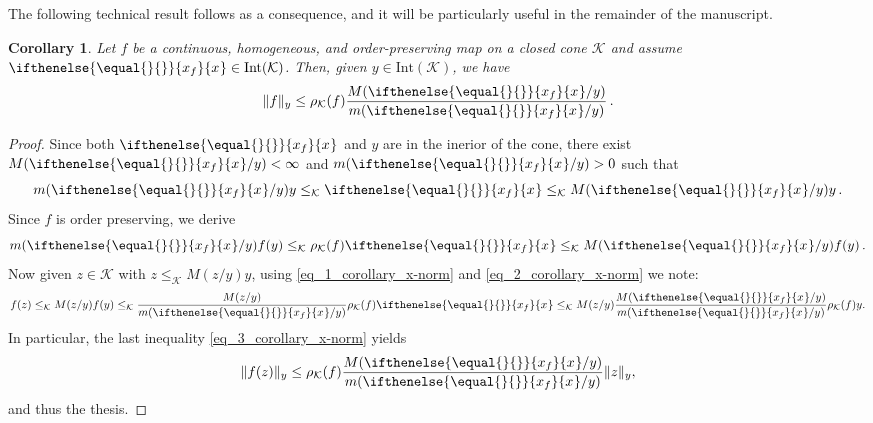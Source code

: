 \documentclass{article}
\newtheorem{corollary}[theorem]{Corollary}
\newcommand{\cradius}{\rho_{\cone}}
\newcommand{\cone}{\mathcal{K}}
\newcommand{\interior}{\mathrm{Int}}
\newcommand{\cleq}{\leq_{\cone}}
\newcommand{\ceigenvector}[1][]{
  \ifthenelse{\equal{#1}{}}
  {{x_f}}
  {{x}_{#1}}}
\begin{document}
The following technical result follows as a consequence, and it will be particularly useful in the remainder of the manuscript.
%

\begin{corollary}\label{Corollary_x-norm}
Let $f$ be a continuous, homogeneous, and order-preserving map on a closed cone $\cone$ and assume $\ceigenvector\in\interior(\cone)$. Then, given $y\in\interior(\cone)$, we have
\begin{equation}
\|f\|_y \leq \cradius(f) \frac{M(\ceigenvector/y)}{m(\ceigenvector/y)}\,.
\end{equation}
\end{corollary}
\begin{proof}
Since both $\ceigenvector$ and $y$ are in the inerior of the cone, there exist $M(\ceigenvector/y)<\infty$ and $m(\ceigenvector/y)>0$ such that
% 
\begin{equation}\label{eq_1_corollary_x-norm}
m(\ceigenvector/y)y\cleq \ceigenvector \cleq M(\ceigenvector/y)y\,.
\end{equation}
%
Since $f$ is order preserving, we derive 
\begin{equation}\label{eq_2_corollary_x-norm}
m(\ceigenvector/y)f(y)\cleq \cradius(f)\ceigenvector \cleq M(\ceigenvector/y)f(y)\,.
\end{equation}
Now given $z\in\cone$ with $z\cleq M(z/y)y$, using \eqref{eq_1_corollary_x-norm} and \eqref{eq_2_corollary_x-norm} we note:
\begin{equation}\label{eq_3_corollary_x-norm}
f(z)\cleq M(z/y)f(y)\cleq \frac{M(z/y)}{m(\ceigenvector/y)}\cradius(f)\ceigenvector \cleq M(z/y)\frac{M(\ceigenvector/y)}{m(\ceigenvector/y)}\cradius(f)y.
\end{equation} 
In particular, the last inequality \eqref{eq_3_corollary_x-norm} yields 
\begin{equation}
\|f(z)\|_y\leq \cradius(f) \frac{M(\ceigenvector/y)}{m(\ceigenvector/y)} \|z\|_y,
\end{equation}
and thus the thesis.
\end{proof}
%
%
%
%
%
\end{document}
